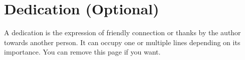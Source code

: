 \section*{Dedication (Optional)}
A dedication is the expression of friendly connection or thanks by the author towards another person. It can occupy one or multiple lines depending on its importance.
You can remove this page if you want.

\pagebreak